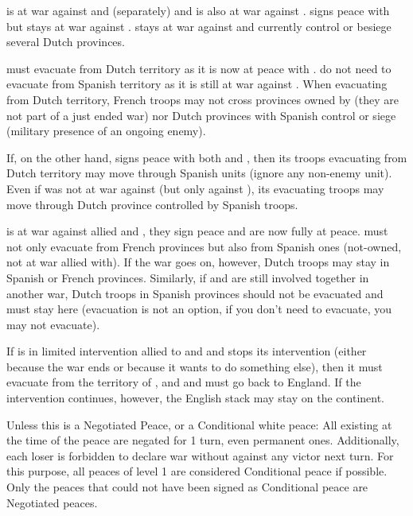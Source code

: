 \begin{exemple}
  \FRA is at war against \HIS and \HOL (separately) and \HIS is also at war
  against \HOL. \FRA signs peace with \HOL but stays at war against \HIS. \HIS
  stays at war against \HOL and currently control or besiege several Dutch
  provinces.

  \FRA must evacuate from Dutch territory as it is now at peace with
  \HOL. \FRA do not need to evacuate from Spanish territory as it is still at
  war against \HIS. When evacuating from Dutch territory, French troops may
  not cross provinces owned by \HIS (they are not part of a just ended war)
  nor Dutch provinces with Spanish control or siege (military presence of an
  ongoing enemy).

  If, on the other hand, \FRA signs peace with both \HIS and \HOL, then its
  troops evacuating from Dutch territory may move through Spanish units
  (ignore any non-enemy unit). Even if \FRA was not at war against \HIS (but
  only against \HOL), its evacuating troops may move through Dutch province
  controlled by Spanish troops.
\end{exemple}

\begin{exemple}[Alliance]
  \FRA is at war against allied \HIS and \HOL, they sign peace and are now
  fully at peace. \HOL must not only evacuate from French provinces but also
  from Spanish ones (not-owned, not at war allied with). If the war goes on,
  however, Dutch troops may stay in Spanish or French provinces. Similarly, if
  \HOL and \HIS are still involved together in another war, Dutch troops in
  Spanish provinces should not be evacuated and must stay here (evacuation is
  not an option, if you don't need to evacuate, you may not evacuate).

  If \ANG is in limited intervention allied to \HIS and \HOL and stops its
  intervention (either because the war ends or because it wants to do
  something else), then it must evacuate from the territory of \FRA, \HIS and
  \HOL and must go back to England. If the intervention continues, however,
  the English stack may stay on the continent.
\end{exemple}

\aparag[Pacification] Unless this is a Negotiated Peace, or a Conditional
white peace:
\bparag All existing \CB at the time of the peace are negated for 1 turn, even
permanent ones.
\bparag Additionally, each loser is forbidden to declare war without \CB
against any victor next turn.
\bparag For this purpose, all peaces of level 1 are considered Conditional
peace if possible. Only the peaces that could not have been signed as
Conditional peace are Negotiated peaces.

